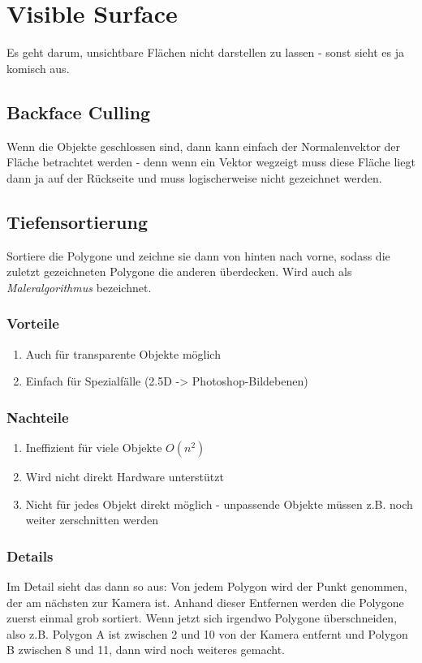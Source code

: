 \chapter{Visible Surface}
Es geht darum, unsichtbare Flächen nicht darstellen zu lassen - sonst sieht es ja komisch aus.

\section{Backface Culling}
Wenn die Objekte geschlossen sind, dann kann einfach der Normalenvektor der Fläche betrachtet werden - denn wenn ein Vektor wegzeigt muss diese Fläche liegt dann ja auf der Rückseite und muss logischerweise nicht gezeichnet werden.

\section{Tiefensortierung}
Sortiere die Polygone und zeichne sie dann von hinten nach vorne, sodass die zuletzt gezeichneten Polygone die anderen überdecken. Wird auch als \textit{Maleralgorithmus} bezeichnet.
\subsection{Vorteile}
\begin{enumerate}
	\item Auch für transparente Objekte möglich
	\item Einfach für Spezialfälle (2.5D -> Photoshop-Bildebenen)
\end{enumerate}
\subsection{Nachteile}
\begin{enumerate}
	\item Ineffizient für viele Objekte \(O(n^2)\)
	\item Wird nicht direkt Hardware unterstützt
	\item Nicht für jedes Objekt direkt möglich - unpassende Objekte  müssen z.B. noch weiter zerschnitten werden
\end{enumerate}
\subsection{Details}
Im Detail sieht das dann so aus:
Von jedem Polygon wird der Punkt genommen, der am nächsten zur Kamera ist. Anhand dieser Entfernen werden die Polygone zuerst einmal grob sortiert. Wenn jetzt sich irgendwo Polygone überschneiden, also z.B. Polygon A ist zwischen 2 und 10 von der Kamera entfernt und Polygon B zwischen 8 und 11, dann wird noch weiteres gemacht.

